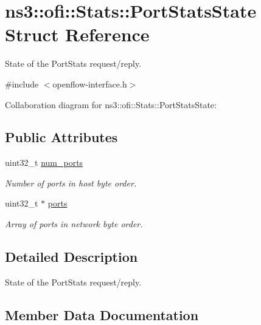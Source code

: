 \hypertarget{structns3_1_1ofi_1_1Stats_1_1PortStatsState}{}\section{ns3\+:\+:ofi\+:\+:Stats\+:\+:Port\+Stats\+State Struct Reference}
\label{structns3_1_1ofi_1_1Stats_1_1PortStatsState}


State of the Port\+Stats request/reply.  




{\ttfamily \#include $<$openflow-\/interface.\+h$>$}



Collaboration diagram for ns3\+:\+:ofi\+:\+:Stats\+:\+:Port\+Stats\+State\+:
\subsection*{Public Attributes}
\begin{DoxyCompactItemize}
\item 
uint32\+\_\+t \hyperlink{structns3_1_1ofi_1_1Stats_1_1PortStatsState_ac207c5b26607e3fada57ce407c2c0a67}{num\+\_\+ports}
\begin{DoxyCompactList}\small\item\em Number of ports in host byte order. \end{DoxyCompactList}\item 
uint32\+\_\+t $\ast$ \hyperlink{structns3_1_1ofi_1_1Stats_1_1PortStatsState_a559bdb1d51567a6045272e53ce209f94}{ports}
\begin{DoxyCompactList}\small\item\em Array of ports in network byte order. \end{DoxyCompactList}\end{DoxyCompactItemize}


\subsection{Detailed Description}
State of the Port\+Stats request/reply. 

\subsection{Member Data Documentation}
